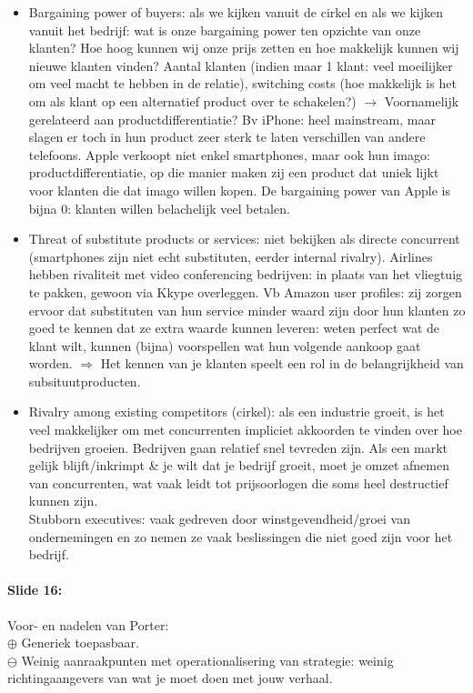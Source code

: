 \documentclass[10pt,a4paper]{report}
\begin{document}
\begin{itemize}
\item Bargaining power of buyers: als we kijken vanuit de cirkel en als we kijken vanuit het bedrijf: wat is onze bargaining power ten opzichte van onze klanten? Hoe hoog kunnen wij onze prijs zetten en hoe makkelijk kunnen wij nieuwe klanten vinden? Aantal klanten (indien maar 1 klant: veel moeilijker om veel macht te hebben in de relatie), switching costs (hoe makkelijk is het om als klant op een alternatief product over te schakelen?) $\rightarrow$ Voornamelijk gerelateerd aan productdifferentiatie? Bv iPhone: heel mainstream, maar slagen er toch in hun product zeer sterk te laten verschillen van andere telefoons. Apple verkoopt niet enkel smartphones, maar ook hun imago: productdifferentiatie, op die manier maken zij een product dat uniek lijkt voor klanten die dat imago willen kopen. De bargaining power van Apple is bijna 0: klanten willen belachelijk veel betalen.
\item Threat of substitute products or services: niet bekijken als directe concurrent (smartphones zijn niet echt substituten, eerder internal rivalry). Airlines hebben rivaliteit met video conferencing bedrijven: in plaats van het vliegtuig te pakken, gewoon via Kkype overleggen. Vb Amazon user profiles: zij zorgen ervoor dat substituten van hun service minder waard zijn door hun klanten zo goed te kennen dat ze extra waarde kunnen leveren: weten perfect wat de klant wilt, kunnen (bijna) voorspellen wat hun volgende aankoop gaat worden. $\Rightarrow$ Het kennen van je klanten speelt een rol in de belangrijkheid van subsituutproducten.
\item Rivalry among existing competitors (cirkel): als een industrie groeit, is het veel makkelijker om met concurrenten impliciet akkoorden te vinden over hoe bedrijven groeien. Bedrijven gaan relatief snel tevreden zijn. Als een markt gelijk blijft/inkrimpt \& je wilt dat je bedrijf groeit, moet je omzet afnemen van concurrenten, wat vaak leidt tot prijsoorlogen die soms heel destructief kunnen zijn.\\
Stubborn executives: vaak gedreven door winstgevendheid/groei van ondernemingen en zo nemen ze vaak beslissingen die niet goed zijn voor het bedrijf.
\end{itemize}

\paragraph{Slide 16:}Voor- en nadelen van Porter:\\
$\oplus$ Generiek toepasbaar.\\
$\ominus$ Weinig aanraakpunten met operationalisering van strategie: weinig richtingaangevers van wat je moet doen met jouw verhaal.
\end{document}
